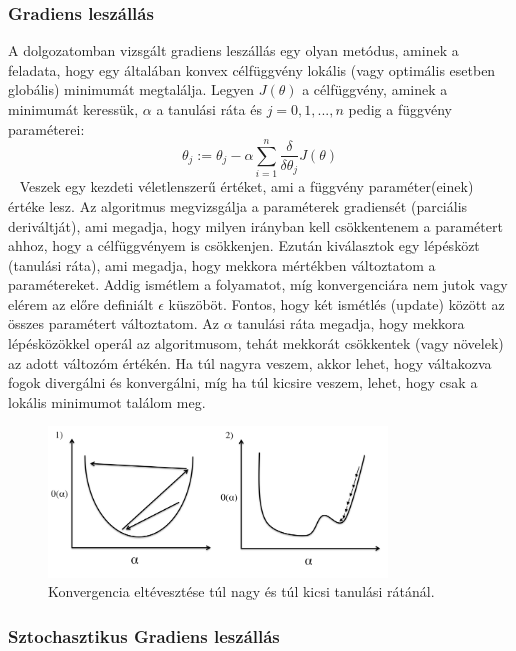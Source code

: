 \documentclass[a4paper,12pt]{article}
\begin{document}
\subsubsection{Gradiens leszállás}

A dolgozatomban vizsgált gradiens leszállás egy olyan metódus, aminek a feladata, hogy egy általában konvex célfüggvény lokális (vagy optimális esetben globális) minimumát megtalálja. Legyen $J(\theta)$ a célfüggvény, aminek a minimumát keressük, $\alpha$ a tanulási ráta és $j=0, 1, ..., n$ pedig a függvény paraméterei:
\[\theta_j:=\theta_j-\alpha\sum\limits_{i=1}^n\frac{\delta}{\delta\theta_j}J(\theta)\]~\cite{andrewml}
Veszek egy kezdeti véletlenszerű értéket, ami a függvény paraméter(einek) értéke lesz. Az algoritmus megvizsgálja a paraméterek gradiensét (parciális deriváltját), ami megadja, hogy milyen irányban kell csökkentenem a paramétert ahhoz, hogy a célfüggvényem is csökkenjen. Ezután kiválasztok egy lépésközt (tanulási ráta), ami megadja, hogy mekkora mértékben változtatom a paramétereket. Addig ismétlem a folyamatot, míg konvergenciára nem jutok vagy elérem az előre definiált $\epsilon$ küszöböt. Fontos, hogy két ismétlés (update) között az összes paramétert változtatom. \newline
Az $\alpha$ tanulási ráta megadja, hogy mekkora lépésközökkel operál az algoritmusom, tehát mekkorát csökkentek (vagy növelek) az adott változóm értékén. Ha túl nagyra veszem, akkor lehet, hogy váltakozva fogok divergálni és konvergálni, míg ha túl kicsire veszem, lehet, hogy csak a lokális minimumot találom meg.

\begin{figure}[ht!]
\centering
\includegraphics[width=90mm]{img/alfa.png}
\caption{Konvergencia eltévesztése túl nagy és túl kicsi tanulási rátánál.~\cite{learningrate} \label{alfa}}
\end{figure}

\subsubsection{Sztochasztikus Gradiens leszállás}
\end{document}

